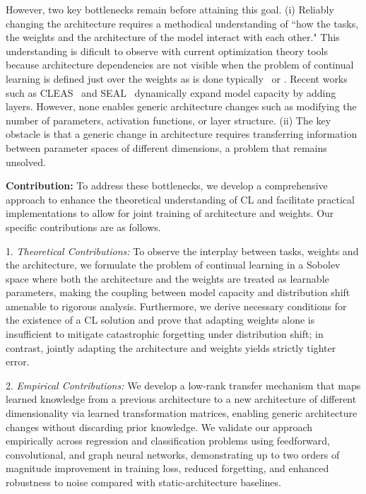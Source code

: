 However, two key bottlenecks remain before attaining this goal. (i) Reliably changing the architecture requires a methodical understanding of ``how the tasks, the weights and the architecture of the model interact with each other." This understanding is dificult to observe with current optimization theory tools because architecture dependencies are not visible when the problem of continual learning is defined just over the weights as is done typically~\cite{chakraborty2025understanding, raghavan2021formalizing} or \cite{lu2025rethinking}. Recent works such as CLEAS~\cite{CLEASgao2022CLEAS} and SEAL~\cite{SEALgambella2025SEAL}     
  dynamically expand model capacity by adding layers. However, none enables generic          
  architecture changes such as modifying the number of parameters, activation functions, or    
  layer structure. (ii) The key obstacle is that a generic change in architecture requires          
  transferring information between parameter spaces of different dimensions, a problem that    
  remains unsolved.

\noindent\textbf{Contribution:}
To address these bottlenecks, we develop a comprehensive approach to enhance the theoretical understanding of CL and facilitate practical implementations to allow for joint training of architecture and weights. Our specific contributions are as follows. 

1. \textit{Theoretical Contributions:} To observe the interplay between tasks, weights and the architecture, we formulate the problem of continual learning in a Sobolev space where both the architecture and the weights are treated as learnable parameters, making the coupling between model capacity and distribution shift amenable to rigorous  
analysis. Furthermore, we derive necessary conditions for the existence of a CL solution and prove that adapting weights alone is insufficient to mitigate catastrophic forgetting under distribution shift; in contrast, jointly adapting the architecture and weights yields strictly tighter error.

2. \textit{Empirical Contributions:}  We develop a low-rank transfer mechanism that maps learned knowledge from a previous architecture to a new architecture of different dimensionality via learned transformation matrices, enabling generic architecture changes without discarding prior knowledge. We validate our approach empirically across regression and classification problems using feedforward, convolutional, and graph neural networks, demonstrating up to two orders of magnitude improvement in training loss, reduced forgetting,
  and enhanced robustness to noise compared with static-architecture baselines.


